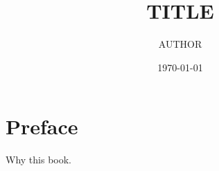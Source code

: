\documentclass[11pt,a4paper,openany]{book}
\title{{{TITLE}}}
\author{{{AUTHOR}}}
\date{\today}
\begin{document}
\frontmatter
\maketitle
\tableofcontents
\chapter{Preface}
Why this book.

\mainmatter



\appendix


\backmatter


\end{document}
